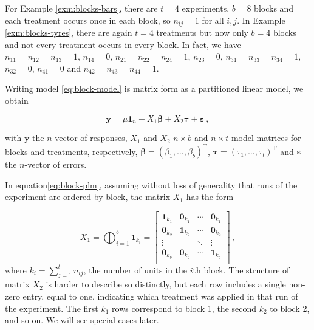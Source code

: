 \documentclass[
]{book}
\theoremstyle{definition}
\theoremstyle{definition}
\theoremstyle{definition}
\theoremstyle{definition}
\theoremstyle{remark}
\begin{document}
For Example \ref{exm:blocks-bars}, there are \(t=4\) experiments, \(b = 8\) blocks and each treatment occurs once in each block, so \(n_{ij} = 1\) for all \(i, j\). In Example \ref{exm:blocks-tyres}, there are again \(t=4\) treatments but now only \(b=4\) blocks and not every treatment occurs in every block. In fact, we have \(n_{11} = n_{12} = n_{13} = 1\), \(n_{14} = 0\), \(n_{21} = n_{22} =n_{24} = 1\), \(n_{23} = 0\), \(n_{31} = n_{33} =n_{34} = 1\), \(n_{32} = 0\), \(n_{41} = 0\) and \(n_{42} = n_{43} =n_{44} = 1\).

Writing model \eqref{eq:block-model} is matrix form as a partitioned linear model, we obtain

\begin{equation}
\boldsymbol{y}= \mu\boldsymbol{1}_n + X_1\boldsymbol{\beta} + X_2\boldsymbol{\tau} + \boldsymbol{\varepsilon}\,,
\label{eq:block-plm}
\end{equation}

with \(\boldsymbol{y}\) the \(n\)-vector of responses, \(X_1\) and \(X_2\) \(n\times b\) and \(n\times t\) model matrices for blocks and treatments, respectively, \(\boldsymbol{\beta} = (\beta_1,\ldots, \beta_b)^{\mathrm{T}}\), \(\boldsymbol{\tau} = (\tau_1,\ldots, \tau_t)^{\mathrm{T}}\) and \(\boldsymbol{\varepsilon}\) the \(n\)-vector of errors.

In equation\eqref{eq:block-plm}, assuming without loss of generality that runs of the experiment are ordered by block, the matrix \(X_1\) has the form

\[
X_1 = \bigoplus_{i = 1}^b \boldsymbol{1}_{k_i} = \begin{bmatrix}
\boldsymbol{1}_{k_1} & \boldsymbol{0}_{k_1} & \cdots &  \boldsymbol{0}_{k_1} \\
\boldsymbol{0}_{k_2} & \boldsymbol{1}_{k_2} & \cdots &  \boldsymbol{0}_{k_2} \\
\vdots & & \ddots & \vdots \\
\boldsymbol{0}_{k_b} & \boldsymbol{0}_{k_b} & \cdots &  \boldsymbol{1}_{k_b} \\
\end{bmatrix}\,,
\]
where \(k_i = \sum_{j=1}^t n_{ij}\), the number of units in the \(i\)th block. The structure of matrix \(X_2\) is harder to describe so distinctly, but each row includes a single non-zero entry, equal to one, indicating which treatment was applied in that run of the experiment. The first \(k_1\) rows correspond to block 1, the second \(k_2\) to block 2, and so on. We will see special cases later.
\end{document}
